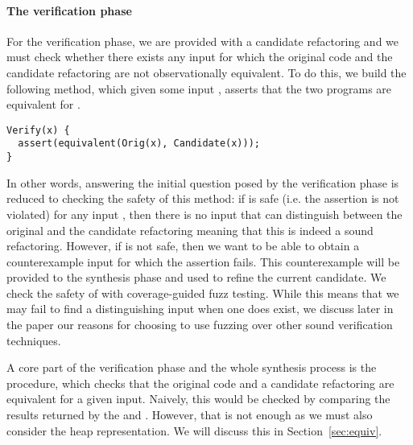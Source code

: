 \documentclass[runningheads,a4paper]{llncs}
\begin{document}
\paragraph{The verification phase} For the verification phase, we are provided with a candidate
refactoring and we must check whether there exists any input
 for which the original code and the candidate
refactoring are not observationally equivalent.  To do this, we build
the following  method, which given some input
, asserts that the two programs are equivalent for
.

\begin{lstlisting}[mathescape=true,showstringspaces=false]
Verify(x) {
  assert(equivalent(Orig(x), Candidate(x)));
}
\end{lstlisting}

In other words, answering the initial question posed by the verification
phase is reduced to checking the safety of this method: if
 is safe (i.e. the assertion is not violated) for any
input , then there is no input that can distinguish
between the original and the candidate refactoring meaning that this
is indeed a sound refactoring. However, if  is not safe,
then we want to be able to obtain a counterexample input
 for which the assertion fails. This counterexample
will be provided to the synthesis phase and used to refine the current
candidate. We check the safety of  with coverage-guided
fuzz testing. While this means that we may fail to find a
distinguishing input when one does exist, we discuss later in the
paper our reasons for choosing to use fuzzing over other sound
verification techniques.

A core part of the verification phase and the whole synthesis process
is the  procedure, which checks that the original code
and a candidate refactoring are equivalent for a given input.
Naively, this would be checked by comparing the results returned by the
 and . However, that is not enough as
we must also consider the heap representation. We will discuss this in
Section~\ref{sec:equiv}.



\end{document}
